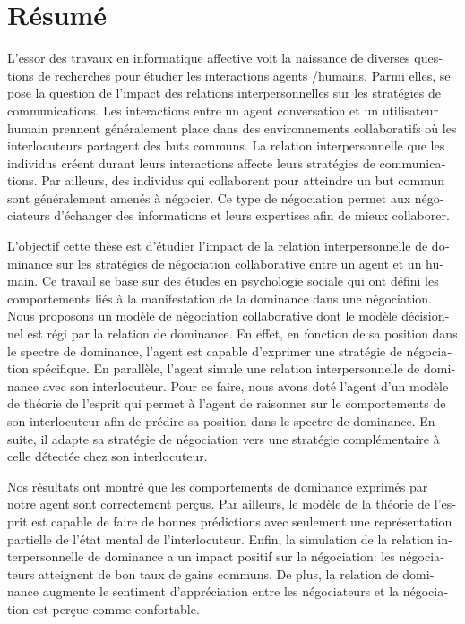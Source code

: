 \begingroup
\let\cleardoublepage\relax
\let\cleardoublepage\relax


\chapter*{Résumé}
\begin{otherlanguage}{french}
L'essor des travaux en informatique affective voit la naissance de diverses questions de recherches pour étudier les interactions agents /humains. Parmi elles, se pose la question de l'impact des relations interpersonnelles sur les stratégies de communications. 
Les interactions entre un agent conversation et un utilisateur humain prennent généralement place dans des environnements collaboratifs où les interlocuteurs partagent des buts communs. La relation interpersonnelle que les individus créent durant leurs interactions affecte leurs stratégies de communications. Par ailleurs, des individus qui collaborent pour atteindre un but commun sont généralement amenés à négocier. Ce type de négociation permet aux négociateurs d'échanger des informations et leurs expertises afin de mieux collaborer.

L'objectif cette thèse est d'étudier l'impact de la relation interpersonnelle de dominance sur les stratégies de négociation collaborative entre un agent et un humain. 
Ce travail se base sur des études en psychologie sociale qui ont défini les comportements liés à la manifestation de la dominance dans une négociation.
Nous proposons un modèle de négociation collaborative dont le modèle décisionnel est régi par la relation de dominance.
En effet, en fonction de sa position dans le spectre de dominance, l'agent est capable d'exprimer une stratégie de négociation spécifique.
En parallèle, l'agent simule une relation interpersonnelle de dominance avec son interlocuteur. Pour ce faire, nous avons doté l'agent d'un modèle de théorie de l'esprit qui permet à l'agent de raisonner sur le comportements de son interlocuteur afin de prédire sa position dans le spectre de dominance. Ensuite, il adapte sa stratégie de négociation vers une stratégie complémentaire à celle détectée chez son interlocuteur. 

Nos résultats ont montré que les comportements de dominance exprimés par notre agent sont correctement perçus. Par ailleurs, le modèle de la théorie de l'esprit est capable de faire de bonnes prédictions avec seulement une représentation partielle de l'état mental de l'interlocuteur. Enfin, la simulation de la relation interpersonnelle de dominance a un impact positif sur la négociation: les négociateurs atteignent de bon taux de gains communs. De plus, la relation de dominance augmente le sentiment d'appréciation entre les négociateurs et la négociation est perçue comme confortable.


\end{otherlanguage}
